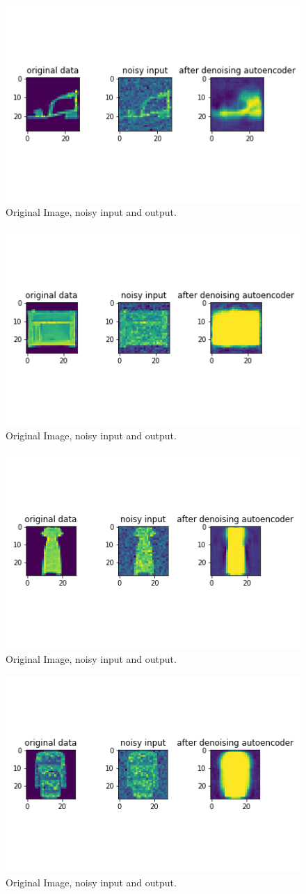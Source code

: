 \documentclass[11pt,a4paper,oneside]{article}
\begin{document}
\begin{figure}[!btp]
	\centering
	\includegraphics[width=.6\textwidth]{figures/save_ev_de_1}
	\caption{Original Image, noisy input and output.}
\end{figure}
\begin{figure}[!btp]
	\centering
	\includegraphics[width=.6\textwidth]{figures/save_ev_de_2}
	\caption{Original Image, noisy input and output.}
\end{figure}
\begin{figure}[!btp]
	\centering
	\includegraphics[width=.6\textwidth]{figures/save_ev_de_3}
	\caption{Original Image, noisy input and output.}
\end{figure}
\begin{figure}[!btp]
	\centering
	\includegraphics[width=.6\textwidth]{figures/save_ev_de_4}
	\caption{Original Image, noisy input and output.}
\end{figure}
\end{document}
